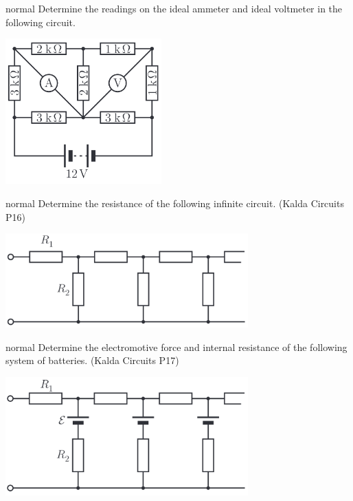 \hypertarget{P28}{}
\begin{solution}{normal} %
Determine the readings on the ideal ammeter and ideal voltmeter in the following circuit.
\begin{center}
    \includegraphics[width=0.45\textwidth]{S1 Figures/S1-28.png}
\end{center}
\end{solution}

\hypertarget{P29}{}
\begin{solution}{normal} %
Determine the resistance of the following infinite circuit. (Kalda Circuits P16)
\begin{center}
    \includegraphics[width=0.7\textwidth]{S1 Figures/S1-29.png}
\end{center}
\end{solution}

\hypertarget{P30}{}
\begin{solution}{normal} %
Determine the electromotive force and internal resistance of the following system of batteries. (Kalda Circuits P17)
\begin{center}
    \includegraphics[width=0.7\textwidth]{S1 Figures/S1-30.png}
\end{center}
\end{solution}


